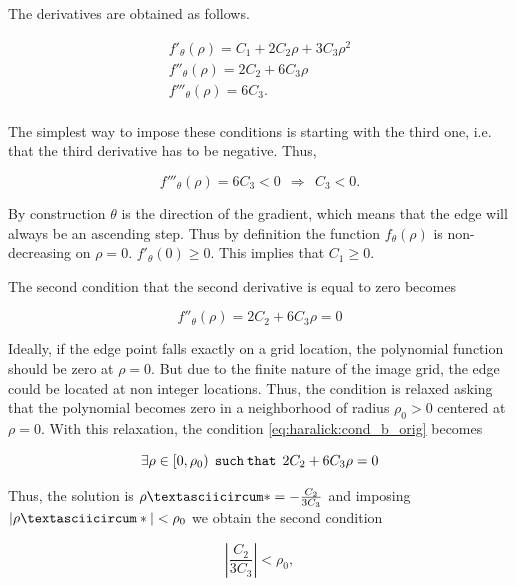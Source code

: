 \documentclass{ipol}
\numberwithin{equation}{section}
\numberwithin{table}{section}
\begin{document}
{The derivatives are obtained as follows.

\begin{align}
	f'_{\theta}(\rho) = C_1 + 2C_2\rho + 3C_3\rho^2 \nonumber \\
	f''_{\theta}(\rho) = 2C_2 + 6C_3\rho \nonumber \\
	f'''_{\theta}(\rho) = 6C_3 .\nonumber \\
\end{align}

\myn{}The simplest way to impose these conditions is starting with the third one, i.e. that the third derivative has to be negative. Thus,\

\begin{equation}
	f'''_{\theta}(\rho) = 6C_3 < 0 \ \ \Rightarrow \ \ C_3 < 0.
\end{equation}

By construction $\theta$ is the direction of the gradient, which means that the edge will always be an ascending step. Thus by definition the function $f_{\theta}(\rho)$ is non-decreasing on $\rho=0$. $f'_{\theta}(0) \geq 0$. This implies that $C_1 \geq 0$.

The second condition that the second derivative is equal to zero becomes

\begin{equation}\label{eq:haralick:cond_b_orig}
	f''_{\theta}(\rho) = 2C_2 + 6C_3\rho = 0
\end{equation}

Ideally, if the edge point falls exactly on a grid location, the polynomial function 
should be zero at $\rho=0$. But due to the finite nature of the image grid, the edge could be located at non integer locations. Thus, the condition is relaxed asking that the polynomial becomes zero in a neighborhood of radius $\rho_0>0$ centered at $\rho=0$. 
With this relaxation, the condition \ref{eq:haralick:cond_b_orig} becomes

\begin{equation}
\exists\rho \in [0,\rho_0) \:\:  \mathtt{such\:that}  \:\:  2C_2 + 6C_3\rho = 0 \\
\end{equation}

Thus, the solution is $\rhoˆ*=-\frac{C_2}{3C_3} $ and imposing $|\rhoˆ*|<\rho_0$ we obtain the second condition

\begin{equation}
\left| \frac{C_2}{3C_3} \right| < \rho_0,
\end{equation}

}
\end{document}
